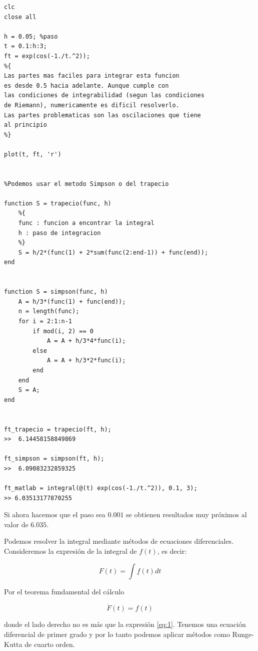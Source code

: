 \begin{lstlisting}
clc
close all

h = 0.05; %paso
t = 0.1:h:3;
ft = exp(cos(-1./t.^2));
%{
Las partes mas faciles para integrar esta funcion
es desde 0.5 hacia adelante. Aunque cumple con
las condiciones de integrabilidad (segun las condiciones
de Riemann), numericamente es dificil resolverlo.
Las partes problematicas son las oscilaciones que tiene
al principio
%}

plot(t, ft, 'r')


%Podemos usar el metodo Simpson o del trapecio

function S = trapecio(func, h)
    %{
    func : funcion a encontrar la integral
    h : paso de integracion
    %}
    S = h/2*(func(1) + 2*sum(func(2:end-1)) + func(end));
end


function S = simpson(func, h)
    A = h/3*(func(1) + func(end));
    n = length(func);
    for i = 2:1:n-1
        if mod(i, 2) == 0
            A = A + h/3*4*func(i);
        else
            A = A + h/3*2*func(i);
        end
    end
    S = A;
end


ft_trapecio = trapecio(ft, h);
>>  6.14458158849869

ft_simpson = simpson(ft, h);
>>  6.09083232859325

ft_matlab = integral(@(t) exp(cos(-1./t.^2)), 0.1, 3);
>> 6.03513177870255
\end{lstlisting}

Si ahora hacemos que el paso sea $0.001$ se obtienen resultados muy próximos al valor de $6.035$.

Podemos resolver la integral mediante métodos de ecuaciones diferenciales. Consideremos la expresión de la integral de $f(t)$, es decir:

\begin{equation}
    F(t) = \int f(t)dt
\end{equation}

Por el teorema fundamental del cálculo

\begin{equation}
    \dot{F}(t) = f(t)
\end{equation}

\noindent donde el lado derecho no es más que la expresión \eqref{eq:1}. Tenemos una ecuación diferencial de primer grado y por lo tanto podemos aplicar métodos como Runge-Kutta de cuarto orden. 




